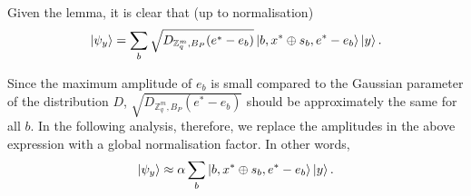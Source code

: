\documentclass{article}
\begin{document}
\begin{itemize}
		Given the lemma, it is clear that (up to normalisation)
		\begin{align}
			\ket{\psi_y} = \sum_b \sqrt{D_{\mathbb{Z}_q^m, B_P}(e^* - e_b)} \ket{b, x^* \oplus s_b, e^* - e_b} \ket{y}.
		\end{align}

		Since the maximum amplitude of $e_b$ is small compared to the Gaussian parameter of the distribution $D$, $\sqrt{D_{\mathbb{Z}_q^m, B_P}(e^* - e_b)}$ should be approximately the same for all $b$. In the following analysis, therefore, we replace the amplitudes in the above expression with a global normalisation factor. In other words,
		\begin{align}
			\ket{\psi_y} \approx \alpha \sum_b \ket{b, x^* \oplus s_b, e^* - e_b} \ket{y}.
		\end{align}
\end{itemize}
\end{document}

